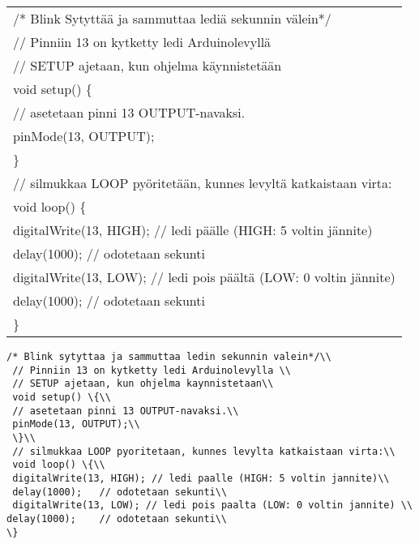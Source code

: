 \begin{fminipage}{10cm}
\begin{tabular}{l}
 /* Blink Sytyttää ja sammuttaa lediä sekunnin välein*/     \\
 // Pinniin 13 on kytketty ledi Arduinolevyllä \\
 // SETUP ajetaan, kun ohjelma käynnistetään\\
 void setup() \{\\
 // asetetaan pinni 13 OUTPUT-navaksi.\\
 pinMode(13, OUTPUT);\\
 \}\\
 // silmukkaa LOOP pyöritetään, kunnes levyltä katkaistaan virta:\\
 void loop() \{\\
 digitalWrite(13, HIGH); // ledi päälle (HIGH: 5 voltin jännite)\\
 delay(1000);	// odotetaan sekunti\\
 digitalWrite(13, LOW); // ledi pois päältä (LOW: 0 voltin jännite) \\
delay(1000);	// odotetaan sekunti\\   
\}
\end{tabular}




\end{fminipage}

\begin{lstlisting}[language=Arduino]  
 /* Blink sytyttaa ja sammuttaa ledin sekunnin valein*/\\
 // Pinniin 13 on kytketty ledi Arduinolevylla \\
 // SETUP ajetaan, kun ohjelma kaynnistetaan\\
 void setup() \{\\
 // asetetaan pinni 13 OUTPUT-navaksi.\\
 pinMode(13, OUTPUT);\\
 \}\\
 // silmukkaa LOOP pyoritetaan, kunnes levylta katkaistaan virta:\\
 void loop() \{\\
 digitalWrite(13, HIGH); // ledi paalle (HIGH: 5 voltin jannite)\\
 delay(1000);	// odotetaan sekunti\\
 digitalWrite(13, LOW); // ledi pois paalta (LOW: 0 voltin jannite) \\
delay(1000);	// odotetaan sekunti\\   
\}
    
\end{lstlisting}
